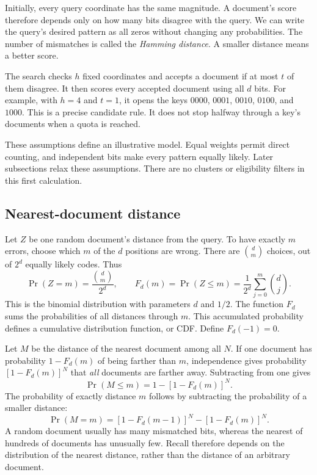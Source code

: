 Initially, every query coordinate has the same magnitude. A document's score therefore depends
only on how many bits disagree with the query. We can write the query's desired pattern as all
zeros without changing any probabilities. The number of mismatches is called the
\emph{Hamming distance}. A smaller distance means a better score.

The search checks $h$ fixed coordinates and accepts a document if at most $t$ of them disagree.
It then scores every accepted document using all $d$ bits. For example, with $h=4$ and $t=1$,
it opens the keys $0000$, $0001$, $0010$, $0100$, and $1000$. This is a precise candidate rule.
It does not stop halfway through a key's documents when a quota is reached.

These assumptions define an illustrative model. Equal weights permit direct counting,
and independent bits make every pattern equally likely. Later subsections relax these assumptions.
There are no clusters or eligibility filters in this first calculation.

\subsection{Nearest-document distance}
Let $Z$ be one random document's distance from the query. To have exactly $m$ errors, choose
which $m$ of the $d$ positions are wrong. There are $\binom{d}{m}$ choices, out of $2^d$
equally likely codes. Thus
\begin{equation}
\Pr(Z=m)=\frac{\binom{d}{m}}{2^d},\qquad
F_d(m)=\Pr(Z\le m)=\frac{1}{2^d}\sum_{j=0}^{m}\binom{d}{j}.
\label{eq:one-document-distance}
\end{equation}
This is the binomial distribution with parameters $d$ and $1/2$. The function $F_d$ sums the
probabilities of all distances through $m$. This accumulated probability defines a cumulative
distribution function, or CDF. Define $F_d(-1)=0$.

Let $M$ be the distance of the nearest document among all $N$. If one document has
probability $1-F_d(m)$ of being farther than $m$, independence gives probability
$[1-F_d(m)]^N$ that \emph{all} documents are farther away. Subtracting from one gives
\begin{equation}
\Pr(M\le m)=1-[1-F_d(m)]^N.
\label{eq:nearest-distance-cdf}
\end{equation}
The probability of exactly distance $m$ follows by subtracting the probability of a smaller distance:
\begin{equation}
\Pr(M=m)=[1-F_d(m-1)]^N-[1-F_d(m)]^N.
\label{eq:nearest-distance-mass}
\end{equation}
A random document usually has many mismatched bits, whereas the nearest of hundreds of
documents has unusually few. Recall therefore depends on the distribution of the nearest
distance, rather than the distance of an arbitrary document.


